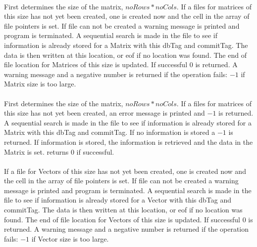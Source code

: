\\
First determines the size of the matrix, $noRows * noCols$. If a files
for matrices of this size has not yet been created, one is created now
and the cell in the array of file pointers is set. If file can not be
created a warning message is printed and program is terminated. A sequential search
is made in the file to see if information is already stored for a Matrix with
this \p dbTag and \p commitTag. The data is then written at this
location, or eof if no location was found. The end of file location
for Matrices of this size is updated. If successful $0$ is
returned. A warning message and a negative number is returned if the
operation fails: $-1$ if Matrix size is too large. \\

\\
First determines the size of the matrix, $noRows * noCols$. If a files
for matrices of this size has not yet been created, an error message
is printed and $-1$ is returned.  A sequential search
is made in the file to see if information is already stored for a Matrix with
this \p dbTag and \p commitTag. If no information is stored a
$-1$ is returned. If information is stored, the information is
retrieved and the data in the Matrix is set. returns $0$ if
successful. \\

\\
If a file
for Vectors of this size has not yet been created, one is created now
and the cell in the array of file pointers is set. If file can not be
created a warning message is printed and program is terminated. A sequential search
is made in the file to see if information is already stored for a Vector with
this \p dbTag and \p commitTag. The data is then written at this
location, or eof if no location was found. The end of file location
for Vectors of this size is updated. If successful $0$ is
returned. A warning message and a negative number is returned if the
operation fails: $-1$ if Vector size is too large. \\

